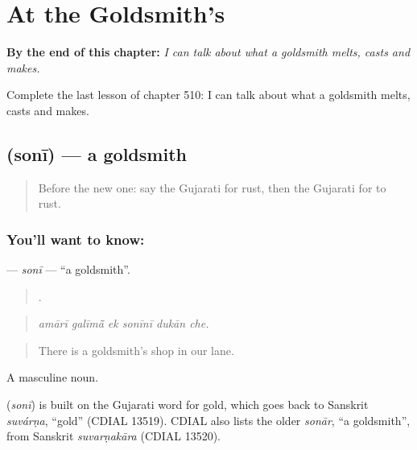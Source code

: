 
\chapter{At the Goldsmith's}
\label{ch:gu-at-the-goldsmith-s}

\begin{chapteropening}
\textbf{By the end of this chapter:} \emph{I can talk about what a goldsmith melts, casts and makes.}

Complete the last lesson of chapter 510: I can talk about what a goldsmith melts, casts and makes.
\end{chapteropening}

\section[\texorpdfstring{\gu{સોની} (sonī)}{સોની (sonī)}]{ (sonī) — a goldsmith}

\label{lesson:GU-C510-soni}



\begin{quote}
Before the new one: say the Gujarati for rust, then the Gujarati for to rust.
\end{quote}

\subsection*{You'll want to know: }
\textbf{} — \emph{sonī} — \textquotedblleft{}a goldsmith\textquotedblright{}.

\begin{quote}
     .
\end{quote}

\begin{quote}
\emph{amārī galīmā̃ ek sonīnī dukān che.}
\end{quote}

\begin{quote}
There is a goldsmith's shop in our lane.
\end{quote}

A masculine noun.

\begin{cousinweb}
\textbf{} (\emph{sonī}) is built on the Gujarati word for gold, which goes back to Sanskrit \emph{suvárṇa}, \textquotedblleft{}gold\textquotedblright{} (CDIAL 13519). CDIAL also lists the older \emph{sonār}, \textquotedblleft{}a goldsmith\textquotedblright{}, from Sanskrit \emph{suvarṇakāra} (CDIAL 13520).
\end{cousinweb}


